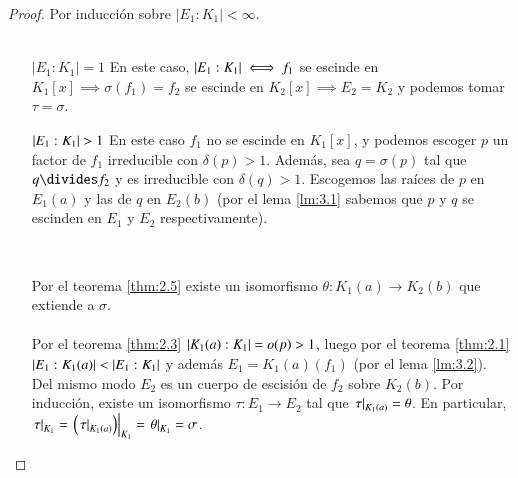 \begin{proof}
    Por inducción sobre $|E_1:K_1| < \infty$.\\\\
    \begin{itemize}
        \item[$|E_1:K_1|=1$] En este caso, $\left|E_1:K_1\right| \iff f_1$ se escinde en $K_1[x] \implies \sigma(f_1) = f_2$ se escinde en $K_2[x] \implies E_2 = K_2$ y podemos tomar $\tau = \sigma$.
        \item[$\vabs{E_1:K_1}>1$] En este caso $f_1$ no se escinde en $K_1[x]$, y podemos escoger $p$ un factor de $f_1$ irreducible con $\delta(p) > 1$. Además, sea $q = \sigma(p)$ tal que $q \divides f_2$ y es irreducible con $\delta(q) > 1$.
        Escogemos las raíces de $p$ en $E_1(a)$ y las de $q$ en $E_2(b)$ (por el lema \ref{lm:3.1} sabemos que $p$ y $q$ se escinden en $E_1$ y $E_2$ respectivamente).
        \begin{center}
            \\
        \end{center}
        Por el teorema \ref{thm:2.5} existe un isomorfismo $\theta: K_1(a) \to K_2(b)$ que extiende a $\sigma$.\\\\
        Por el teorema \ref{thm:2.3} $\left|K_1(a):K_1\right| = o(p) > 1$, luego por el teorema \ref{thm:2.1} $\left|E_1:K_1(a)\right| < \left|E_1:K_1\right|$ y además $E_1 = K_1(a)(f_1)$ (por el lema \ref{lm:3.2}). Del mismo modo $E_2$ es un cuerpo de escisión de $f_2$ sobre $K_2(b)$.
        Por inducción, existe un isomorfismo $\tau: E_1 \to E_2$ tal que $\left.\tau\right|_{K_1(a)} = \theta$. En particular, $\left.\tau\right|_{K_1} = \left.\left( \left.\tau\right|_{K_1(a)} \right)\right|_{K_1} = \left.\theta\right|_{K_1} = \sigma$.
    \end{itemize}
\end{proof}

